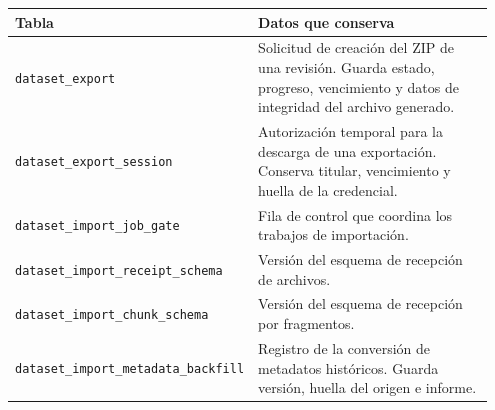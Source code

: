 \noindent
\begin{tabular}{@{}p{0.40\linewidth}p{0.55\linewidth}@{}}
\hline
\textbf{Tabla} & \textbf{Datos que conserva} \\
\hline
\texttt{dataset\_\allowbreak{}export} & Solicitud de creación del ZIP de una revisión. Guarda estado, progreso, vencimiento y datos de integridad del archivo generado. \\
\texttt{dataset\_\allowbreak{}export\_\allowbreak{}session} & Autorización temporal para la descarga de una exportación. Conserva titular, vencimiento y huella de la credencial. \\
\texttt{dataset\_\allowbreak{}import\_\allowbreak{}job\_\allowbreak{}gate} & Fila de control que coordina los trabajos de importación. \\
\texttt{dataset\_\allowbreak{}import\_\allowbreak{}receipt\_\allowbreak{}schema} & Versión del esquema de recepción de archivos. \\
\texttt{dataset\_\allowbreak{}import\_\allowbreak{}chunk\_\allowbreak{}schema} & Versión del esquema de recepción por fragmentos. \\
\texttt{dataset\_\allowbreak{}import\_\allowbreak{}metadata\_\allowbreak{}backfill} & Registro de la conversión de metadatos históricos. Guarda versión, huella del origen e informe. \\
\hline
\end{tabular}

\endgroup

